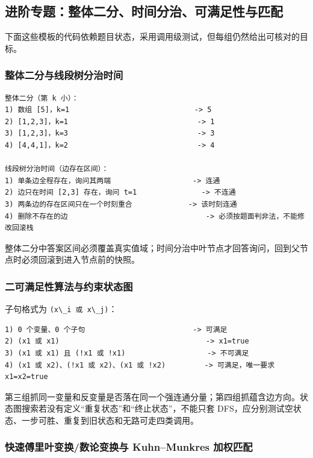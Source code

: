 \subsection{进阶专题：整体二分、时间分治、可满足性与匹配}

下面这些模板的代码依赖题目状态，采用调用级测试，但每组仍然给出可核对的目标。

\subsubsection{整体二分与线段树分治时间}

\begin{lstlisting}
整体二分（第 k 小）：
1) 数组 [5]，k=1                             -> 5
2) [1,2,3]，k=1                              -> 1
3) [1,2,3]，k=3                              -> 3
4) [4,4,1]，k=2                              -> 4

线段树分治时间（边存在区间）：
1) 单条边全程存在，询问其两端                   -> 连通
2) 边只在时间 [2,3] 存在，询问 t=1               -> 不连通
3) 两条边的存在区间只在一个时刻重合             -> 该时刻连通
4) 删除不存在的边                                -> 必须按题面判非法，不能修改回滚栈
\end{lstlisting}

整体二分中答案区间必须覆盖真实值域；时间分治中叶节点才回答询问，回到父节点时必须回滚到进入节点前的快照。

\subsubsection{二可满足性算法与约束状态图}

子句格式为 \passthrough{\lstinline!(x\_i 或 x\_j)!}：

\begin{lstlisting}
1) 0 个变量、0 个子句                         -> 可满足
2) (x1 或 x1)                                  -> x1=true
3) (x1 或 x1) 且 (!x1 或 !x1)                   -> 不可满足
4) (x1 或 x2)、(!x1 或 x2)、(x1 或 !x2)         -> 可满足，唯一要求 x1=x2=true
\end{lstlisting}

第三组抓同一变量和反变量是否落在同一个强连通分量；第四组抓蕴含边方向。状态图搜索若没有定义``重复状态''和``终止状态''，不能只套 DFS，应分别测试空状态、一步可胜、重复到旧状态和无路可走四类调用。

\subsubsection{快速傅里叶变换/数论变换与 Kuhn--Munkres 加权匹配}

